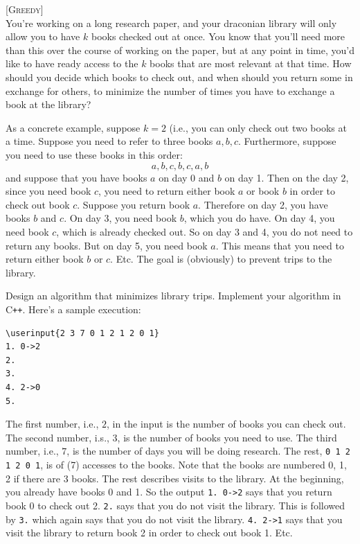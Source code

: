 \textsc{[Greedy]}
\\
You're working on a
long research paper, and your draconian library will only allow you to have
$k$ books checked out at once. 
You know that you’ll need more
than this over the course of working on the paper, but at any point in time,
you'd like to have ready access to the $k$ 
books that are most relevant at
that time. How should you decide which books to check out, and when should
you return some in exchange for others, to minimize the number of times you
have to exchange a book at the library?

As a concrete example, 
suppose $k = 2$ (i.e., you can only 
check out two books at a time.
Suppose you need to refer to 
three books $a, b, c$.
Furthermore, suppose you need to 
use these books in this order:
\[
a,b,c,b,c,a,b
\]
and suppose that you have books $a$ on day 0
and $b$ on day 1.
Then on the day 2, since you need book $c$,
you need to return either book $a$ or book $b$
in order to check out book $c$.
Suppose you return book $a$.
Therefore on day 2, you have books $b$ and $c$.
On day 3, you need book $b$, which you do have.
On day 4, you need book $c$, which is
already checked out.
So on day 3 and 4, you do not need to return
any books.
But on day 5, you need book $a$.
This means that you need to return either
book $b$ or $c$.
Etc.
The goal is (obviously) to prevent trips to the library.

Design an algorithm that minimizes library trips.
Implement your algorithm in C\texttt{++}.
Here's a sample execution:
\begin{Verbatim}[frame=single,commandchars=\\\{\},fontsize=\footnotesize]
\userinput{2 3 7 0 1 2 1 2 0 1}
1. 0->2
2.
3.
4. 2->0
5.
\end{Verbatim}
The first number, i.e., $2$, in the input is the number of books you can check out.
The second number, i.s., $3$, is the number of books you need to use.
The third number, i.e., $7$, is the number of days you will be doing research.
The rest, \verb!0 1 2 1 2 0 1!, is of (7) accesses to the books.
Note that the books are numbered 0, 1, 2 if there are 3 books.
The rest describes visits to the library.
At the beginning, you already have books 0 and 1.
So the output \verb!1. 0->2! says that you return book 0 to check out 2.
\verb!2.! says that you do not visit the library.
This is followed by \verb!3.! which again says that you do not visit the library.
\verb!4. 2->1! says that you visit the library to return book 2 in order to check out book 1.
Etc.


